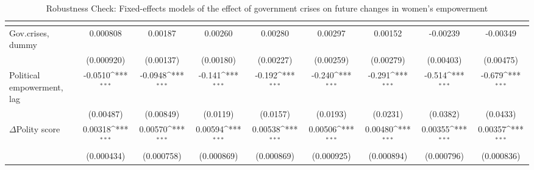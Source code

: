 \begin{table}[htbp]\centering
\def\sym#1{\ifmmode^{#1}\else\(^{#1}\)\fi}
\caption{Robustness Check: Fixed-effects models of the effect of government crises on future changes in women's empowerment \label{polemgovnowar}}
\begin{tabular}{l*{8}{c}}
\hline\hline
                    &&&&&&&&\\
\hline
Gov.crises, dummy    &    0.000808         &     0.00187         &     0.00260         &     0.00280         &     0.00297         &     0.00152         &    -0.00239         &    -0.00349         \\
                    &  (0.000920)         &   (0.00137)         &   (0.00180)         &   (0.00227)         &   (0.00259)         &   (0.00279)         &   (0.00403)         &   (0.00475)         \\
[1em]
Political empowerment, lag   &     -0.0510\sym{***}&     -0.0948\sym{***}&      -0.141\sym{***}&      -0.192\sym{***}&      -0.240\sym{***}&      -0.291\sym{***}&      -0.514\sym{***}&      -0.679\sym{***}\\
                    &   (0.00487)         &   (0.00849)         &    (0.0119)         &    (0.0157)         &    (0.0193)         &    (0.0231)         &    (0.0382)         &    (0.0433)         \\
[1em]
$\Delta$Polity score            &     0.00318\sym{***}&     0.00570\sym{***}&     0.00594\sym{***}&     0.00538\sym{***}&     0.00506\sym{***}&     0.00480\sym{***}&     0.00355\sym{***}&     0.00357\sym{***}\\
                    &  (0.000434)         &  (0.000758)         &  (0.000869)         &  (0.000869)         &  (0.000925)         &  (0.000894)         &  (0.000796)         &  (0.000836)         \\

\end{tabular}
\end{table}
